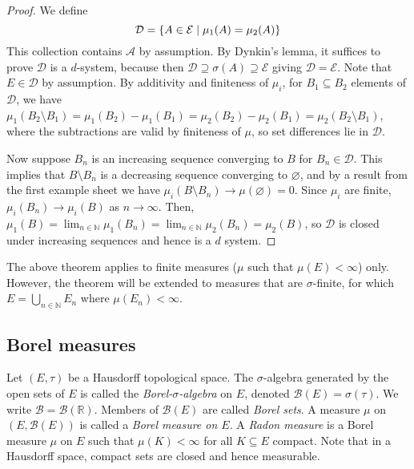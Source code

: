 \begin{proof}
	We define
	\[ \mathcal D = \qty{A \in \mathcal E \mid \mu_1(A) = \mu_2(A)} \]
	This collection contains \( \mathcal A \) by assumption.
	By Dynkin's lemma, it suffices to prove \( \mathcal D \) is a \( d \)-system, because then \( \mathcal D \supseteq \sigma(A) \supseteq \mathcal E \) giving \( \mathcal D = \mathcal E \).
	Note that \( E \in \mathcal D \) by assumption.
	By additivity and finiteness of \( \mu_i \), for \( B_1 \subseteq B_2 \) elements of \( \mathcal D \), we have \( \mu_1(B_2 \setminus B_1) = \mu_1(B_2) - \mu_1(B_1) = \mu_2(B_2) - \mu_2(B_1) = \mu_2(B_2 \setminus B_1) \), where the subtractions are valid by finiteness of \( \mu \), so set differences lie in \( \mathcal D \).

	Now suppose \( B_n \) is an increasing sequence converging to \( B \) for \( B_n \in \mathcal D \).
	This implies that \( B \setminus B_n \) is a decreasing sequence converging to \( \varnothing \), and by a result from the first example sheet we have \( \mu_i(B \setminus B_n) \to \mu(\varnothing) = 0 \).
	Since \( \mu_i \) are finite, \( \mu_i(B_n) \to \mu_i(B) \) as \( n \to \infty \).
	Then, \( \mu_1(B) = \lim_{n \in \mathbb N} \mu_1(B_n) = \lim_{n \in \mathbb N} \mu_2(B_n) = \mu_2(B) \), so \( \mathcal D \) is closed under increasing sequences and hence is a \( d \) system.
\end{proof}
\begin{remark}
	The above theorem applies to finite measures (\( \mu \) such that \( \mu(E) < \infty \)) only.
	However, the theorem will be extended to measures that are \( \sigma \)-finite, for which \( E = \bigcup_{n \in \mathbb N} E_n \) where \( \mu(E_n) < \infty \).
\end{remark}

\subsection{Borel measures}
\begin{definition}
	Let \( (E, \tau) \) be a Hausdorff topological space.
	The \( \sigma \)-algebra generated by the open sets of \( E \) is called the \emph{Borel-\( \sigma \)-algebra} on \( E \), denoted \( \mathcal B(E) = \sigma(\tau) \).
	We write \( \mathcal B = \mathcal B(\mathbb R) \).
	Members of \( \mathcal B(E) \) are called \emph{Borel sets}.
	A measure \( \mu \) on \( (E, \mathcal B(E)) \) is called a \emph{Borel measure on \( E \)}.
	A \emph{Radon measure} is a Borel measure \( \mu \) on \( E \) such that \( \mu(K) < \infty \) for all \( K \subseteq E \) compact.
	Note that in a Hausdorff space, compact sets are closed and hence measurable.
\end{definition}


